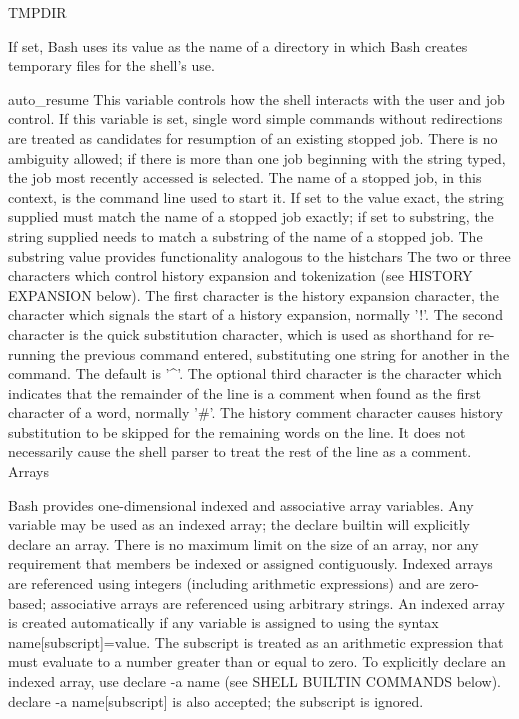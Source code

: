 \documentclass[11pt]{article}
\begin{document}
TMPDIR

If set, Bash uses its value as the name of a directory in which Bash creates temporary files for the shell's use.

auto_resume
This variable controls how the shell interacts with the user and job control. If this variable is set, single word simple commands without redirections are treated as candidates for resumption of an existing stopped job. There is no ambiguity allowed; if there is more than one job beginning with the string typed, the job most recently accessed is selected. The name of a stopped job, in this context, is the command line used to start it. If set to the value exact, the string supplied must match the name of a stopped job exactly; if set to substring, the string supplied needs to match a substring of the name of a stopped job. The substring value provides functionality analogous to the %
histchars
The two or three characters which control history expansion and tokenization (see HISTORY EXPANSION below). The first character is the history expansion character, the character which signals the start of a history expansion, normally '!'. The second character is the quick substitution character, which is used as shorthand for re-running the previous command entered, substituting one string for another in the command. The default is '^'. The optional third character is the character which indicates that the remainder of the line is a comment when found as the first character of a word, normally '#'. The history comment character causes history substitution to be skipped for the remaining words on the line. It does not necessarily cause the shell parser to treat the rest of the line as a comment.
Arrays

Bash provides one-dimensional indexed and associative array variables. Any variable may be used as an indexed array; the declare builtin will explicitly declare an array. There is no maximum limit on the size of an array, nor any requirement that members be indexed or assigned contiguously. Indexed arrays are referenced using integers (including arithmetic expressions) and are zero-based; associative arrays are referenced using arbitrary strings.
An indexed array is created automatically if any variable is assigned to using the syntax name[subscript]=value. The subscript is treated as an arithmetic expression that must evaluate to a number greater than or equal to zero. To explicitly declare an indexed array, use declare -a name (see SHELL BUILTIN COMMANDS below). declare -a name[subscript] is also accepted; the subscript is ignored.
\end{document}
